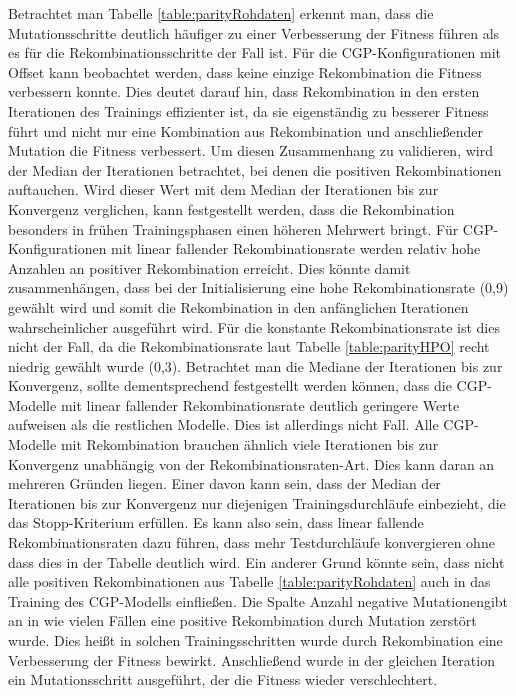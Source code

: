 Betrachtet man Tabelle \ref{table:parityRohdaten} erkennt man, dass die Mutationsschritte deutlich häufiger zu einer Verbesserung der Fitness führen als es für die Rekombinationsschritte der Fall ist.
Für die CGP-Konfigurationen mit Offset kann beobachtet werden, dass keine einzige Rekombination die Fitness verbessern konnte. 
Dies deutet darauf hin, dass Rekombination in den ersten Iterationen des Trainings effizienter ist, da sie eigenständig zu besserer Fitness führt und nicht nur eine Kombination aus Rekombination und anschließender Mutation die Fitness verbessert.
Um diesen Zusammenhang zu validieren, wird der Median der Iterationen betrachtet, bei denen die positiven Rekombinationen auftauchen.
Wird dieser Wert mit dem Median der Iterationen bis zur Konvergenz verglichen, kann festgestellt werden, dass die Rekombination besonders in frühen Trainingsphasen einen höheren Mehrwert bringt.
Für CGP-Konfigurationen mit linear fallender Rekombinationsrate werden relativ hohe Anzahlen an positiver Rekombination erreicht.
Dies könnte damit zusammenhängen, dass bei der Initialisierung eine hohe Rekombinationsrate (0,9) gewählt wird und somit die Rekombination in den anfänglichen Iterationen wahrscheinlicher ausgeführt wird.
Für die konstante Rekombinationsrate ist dies nicht der Fall, da die Rekombinationsrate laut Tabelle \ref{table:parityHPO} recht niedrig gewählt wurde (0,3).
Betrachtet man die Mediane der Iterationen bis zur Konvergenz, sollte dementsprechend festgestellt werden können, dass die CGP-Modelle mit linear fallender Rekombinationsrate deutlich geringere Werte aufweisen als die restlichen Modelle.
Dies ist allerdings nicht Fall.
Alle CGP-Modelle mit Rekombination brauchen ähnlich viele Iterationen bis zur Konvergenz unabhängig von der Rekombinationsraten-Art.
Dies kann daran an mehreren Gründen liegen.
Einer davon kann sein, dass der Median der Iterationen bis zur Konvergenz nur diejenigen Trainingsdurchläufe einbezieht, die das Stopp-Kriterium erfüllen. 
Es kann also sein, dass linear fallende Rekombinationsraten dazu führen, dass mehr Testdurchläufe konvergieren ohne dass dies in der Tabelle deutlich wird.
Ein anderer Grund könnte sein, dass nicht alle positiven Rekombinationen aus Tabelle \ref{table:parityRohdaten} auch in das Training des CGP-Modells einfließen. 
Die Spalte \glqq Anzahl negative Mutationen\grqq\space gibt an in wie vielen Fällen eine positive Rekombination durch Mutation zerstört wurde.
Dies heißt in solchen Trainingsschritten wurde durch Rekombination eine Verbesserung der Fitness bewirkt.
Anschließend wurde in der gleichen Iteration ein Mutationsschritt ausgeführt, der die Fitness wieder verschlechtert.
